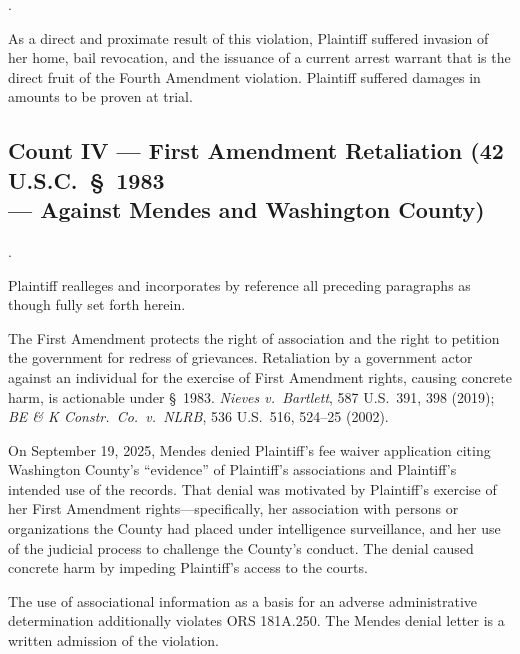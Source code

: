 \documentclass[12pt,letterpaper]{article}
\newcounter{complaintpara}
\newenvironment{paras}{%
	\begin{list}{\arabic{complaintpara}.}{%
			\setlength{\leftmargin}{0.5in}%
			\setlength{\labelwidth}{0.4in}%
			\setlength{\labelsep}{0.1in}%
			\setlength{\itemsep}{0pt}%
			\setlength{\parsep}{0pt}%
			\setlength{\topsep}{6pt}%
		}%
	}{%
	\end{list}%
}
\newcommand{\sect}{§}
\begin{document}
\begin{paras}
		\item As a direct and proximate result of this violation,
		Plaintiff suffered invasion of her home, bail revocation, and
		the issuance of a current arrest warrant that is the direct
		fruit of the Fourth Amendment violation. Plaintiff suffered
		damages in amounts to be proven at trial.
		
	\end{paras}
	\subsection*{Count IV --- First Amendment Retaliation (42 U.S.C.\ \S\ 1983\\
		--- Against Mendes and Washington County)}
	\begin{paras}
		
		\item Plaintiff realleges and incorporates by reference all
		preceding paragraphs as though fully set forth herein.
		
		\item The First Amendment protects the right of association and
		the right to petition the government for redress of
		grievances. Retaliation by a government actor against an
		individual for the exercise of First Amendment rights,
		causing concrete harm, is actionable under \sect\ 1983.
		\textit{Nieves v.\ Bartlett}, 587 U.S.\ 391, 398 (2019);
		\textit{BE \& K Constr.\ Co.\ v.\ NLRB}, 536 U.S.\ 516,
		524--25 (2002).
		
		\item On September 19, 2025, Mendes denied Plaintiff's fee
		waiver application citing Washington County's ``evidence'' of
		Plaintiff's associations and Plaintiff's intended use of the
		records. That denial was motivated by Plaintiff's exercise of
		her First Amendment rights---specifically, her association
		with persons or organizations the County had placed under
		intelligence surveillance, and her use of the judicial process
		to challenge the County's conduct. The denial caused concrete
		harm by impeding Plaintiff's access to the courts.
		
		\item The use of associational information as a basis for an
		adverse administrative determination additionally violates
		ORS 181A.250. The Mendes denial letter is a written admission
		of the violation.
		

\end{paras}
\end{document}
